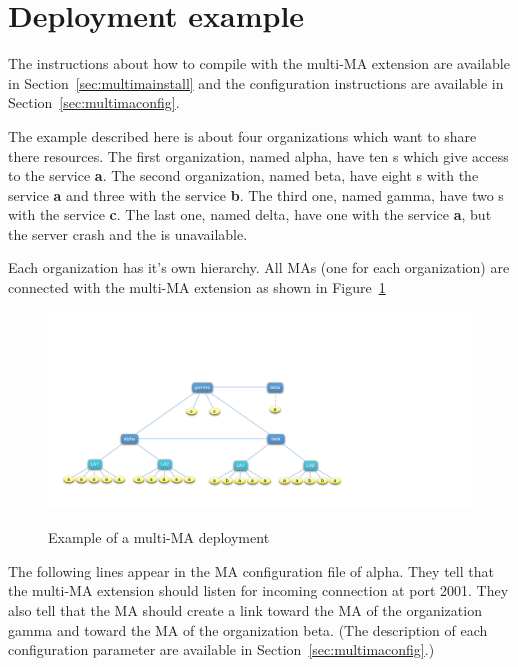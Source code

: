 \section{Deployment example}

The instructions about how to compile \diet with the multi-MA
extension are available in Section~\ref{sec:multimainstall} and the
configuration instructions are available in
Section~\ref{sec:multimaconfig}.

The example described here is about four organizations which want to
share there resources. The first organization, named alpha, have ten
{\sed}s which give access to the service \textbf{a}. The second
organization, named beta, have eight {\sed}s with the service
\textbf{a} and three with the service \textbf{b}. The third one, named
gamma, have two {\sed}s with the service \textbf{c}.  The last one,
named delta, have one \sed with the service \textbf{a}, but the server
crash and the \sed is unavailable.

Each organization has it's own \diet hierarchy. All MAs (one for each
organization) are connected with the multi-MA extension as shown in
Figure~\ref{fig:multima}


\begin{figure}[h]
 \begin{center}
   \includegraphics[scale=0.4]{fig/multima}
   \label{fig:multima}
  \caption{Example of a multi-MA deployment}
 \end{center}
\end{figure}

The following lines appear in the MA configuration file of alpha. They
tell that the multi-MA extension should listen for incoming connection
at port 2001. They also tell that the MA should create a link toward
the MA of the organization gamma and toward the MA of the organization
beta. (The description of each configuration parameter are available
in Section~\ref{sec:multimaconfig}.)

